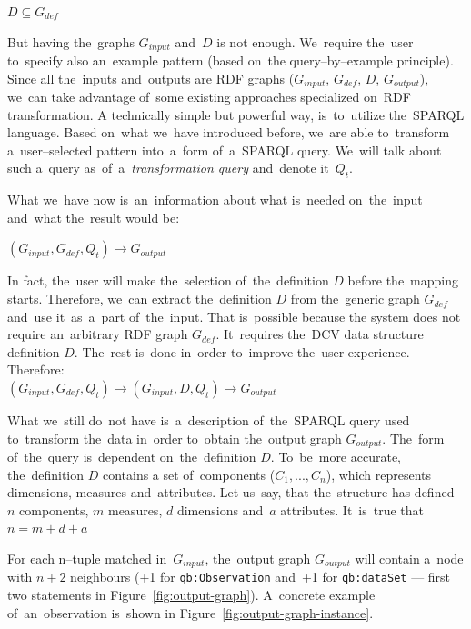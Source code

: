 {\centering $D \subseteq G_{def}$ \\[0.5cm]}

But having the~graphs $G_{input}$ and~$D$ 
is not enough. We~require the~user to~specify also an~example pattern (based on~the
query--by--example principle). Since all the~inputs and~outputs are RDF
graphs ($G_{input}$, $G_{def}$, $D$, $G_{output}$), we~can take 
advantage of~some existing approaches specialized on~RDF transformation. 
A technically simple but powerful way, is~to~utilize the~SPARQL language. Based on~what we~have introduced before, we~are able to~transform a~user--selected pattern into~a~form of~a~SPARQL
query. We~will talk about such a~query as~of~a~\emph{transformation query} and~denote it~$Q_t$.

What we~have now is~an~information about what is~needed on~the~input and~what the~result would be:

{\centering $(G_{input}, G_{def}, Q_t) \rightarrow G_{output}$ \\[0.5cm]}

In fact, the~user will make the~selection of~the~definition $D$ before the~mapping starts. Therefore, we~can extract the~definition $D$ from the~generic graph $G_{def}$ and~use it~as~a~part of~the~input. That is~possible because 
the system does not require an~arbitrary RDF graph $G_{def}$. It~requires the~DCV 
data structure definition $D$. The~rest is~done in~order to~improve the~user 
experience. Therefore:\\

{\centering $(G_{input}, G_{def}, Q_t) \rightarrow (G_{input}, D, Q_t) \rightarrow G_{output}$  \\[0.5cm]}

What we~still do~not have is~a~description of~the~SPARQL query used to~transform the~data in~order to~obtain the~output graph $G_{output}$. The~form of~the~query is~dependent on~the~definition $D$. To~be~more accurate, the~definition $D$ contains
a set of~components ($C_1, ... , C_n$), which represents dimensions, measures and~attributes. Let us~say, that the~structure has defined $n$ components, $m$ measures, $d$ dimensions and~$a$ 
attributes. It~is~true that\\

{\centering $n = m+d+a$ \\[0.5cm]}

For each n--tuple matched in~$G_{input}$, the~output graph $G_{output}$ will contain a~node with $n+2$ 
neighbours (+1 for \verb|qb:Observation| and~+1 for \verb|qb:dataSet| --- first two statements
in Figure~\ref{fig:output-graph}). A~concrete example of~an~observation is~shown 
in Figure~\ref{fig:output-graph-instance}.

